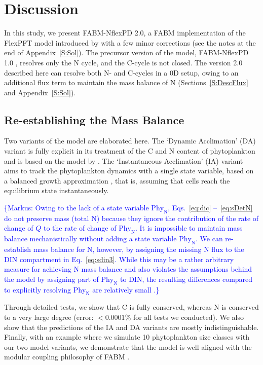\documentclass[gmd, manuscript]{copernicus}
\newcommand{\markus}[1]{\textcolor{blue}{\{Markus: #1\}}}
\begin{document}
%

\FloatBarrier%
\section{Discussion}

In this study, we present FABM-NflexPD 2.0, a FABM implementation of the FlexPFT model introduced by \citet{Smith2016} with a few minor corrections (see the notes at the end of Appendix~\ref{S:Sol}). The precursor version of the model, FABM-NflexPD 1.0 \citep{Kerimoglu2021}, resolves only the N cycle, and the C-cycle is not closed. The version 2.0 described here can resolve both N- and C-cycles in a 0D setup, owing to an additional flux term to maintain the mass balance of N (Sections~\ref{S:DescFlux} and Appendix~\ref{S:Sol}).

\subsection{Re-establishing the Mass Balance}

Two variants of the model are elaborated here. The `Dynamic Acclimation' (DA) variant is fully explicit in its treatment of the C and N content of phytoplankton and is based on the model by \citet{Pahlowetal13}. The `Instantaneous Acclimation' (IA) variant aims to track the phytoplankton dynamics with a single state variable, based on a balanced growth approximation \citep{Burmaster1979}, that is, assuming that cells reach the equilibrium state instantaneously.

\markus{Owing to the lack of a state variable $\text{Phy}_{\text{N}}$, Eqs.~\eqref{eq:dic} --~\eqref{eq:sDetN} do not preserve mass (total N) because they ignore the contribution of the rate of change of $Q$ to the rate of change of $\text{Phy}_{\text{N}}$.  It is impossible to maintain mass balance mechanistically without adding a state variable $\text{Phy}_{\text{N}}$.  We can re-establish mass balance for N, however, by assigning the missing N flux to the DIN compartment in Eq.~\eqref{eq:sdin3}.  While this may be a rather arbitrary measure for achieving N mass balance and also violates the assumptions behind the model by assigning part of $\text{Phy}_{\text{N}}$ to DIN, the resulting differences compared to explicitly resolving $\text{Phy}_{\text{N}}$ are relatively small \citep{Ward2017}.}

Through detailed tests, we show that C is fully conserved, whereas N is conserved to a very large degree (error: $<0.0001\%$ for all tests we conducted). We also show that the predictions of the IA and DA variants are mostly indistinguishable. Finally, with an example where we simulate 10 phytoplankton size classes with our two model variants, we demonstrate that the model is well aligned with the modular coupling philosophy of FABM \citep{Bruggeman2014}.
\end{document}
